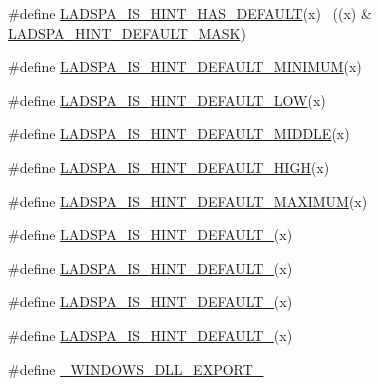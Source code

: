 \begin{DoxyCompactItemize}
\item 
\#define \hyperlink{win_2_l_a_d_s_p_a__plugins-win_2ladspa_8h_ad102c496a31aa9cff9213d9f26b820db}{L\+A\+D\+S\+P\+A\+\_\+\+I\+S\+\_\+\+H\+I\+N\+T\+\_\+\+H\+A\+S\+\_\+\+D\+E\+F\+A\+U\+LT}(x)  ~((x) \& \hyperlink{win_2_l_a_d_s_p_a__plugins-win_2ladspa_8h_a713062e0f0ae5956e12a217323c2a100}{L\+A\+D\+S\+P\+A\+\_\+\+H\+I\+N\+T\+\_\+\+D\+E\+F\+A\+U\+L\+T\+\_\+\+M\+A\+SK})
\item 
\#define \hyperlink{win_2_l_a_d_s_p_a__plugins-win_2ladspa_8h_ae7bd51b583e97ca49c27b4ea969d2c17}{L\+A\+D\+S\+P\+A\+\_\+\+I\+S\+\_\+\+H\+I\+N\+T\+\_\+\+D\+E\+F\+A\+U\+L\+T\+\_\+\+M\+I\+N\+I\+M\+UM}(x)
\item 
\#define \hyperlink{win_2_l_a_d_s_p_a__plugins-win_2ladspa_8h_a56c52818cfb9b1637e2fc7b95c239d33}{L\+A\+D\+S\+P\+A\+\_\+\+I\+S\+\_\+\+H\+I\+N\+T\+\_\+\+D\+E\+F\+A\+U\+L\+T\+\_\+\+L\+OW}(x)        
\item 
\#define \hyperlink{win_2_l_a_d_s_p_a__plugins-win_2ladspa_8h_a32aba3a3ba980295e45cd27f68b9be78}{L\+A\+D\+S\+P\+A\+\_\+\+I\+S\+\_\+\+H\+I\+N\+T\+\_\+\+D\+E\+F\+A\+U\+L\+T\+\_\+\+M\+I\+D\+D\+LE}(x)  
\item 
\#define \hyperlink{win_2_l_a_d_s_p_a__plugins-win_2ladspa_8h_a8360d24dea0ecb7f3a6f9073bdcac022}{L\+A\+D\+S\+P\+A\+\_\+\+I\+S\+\_\+\+H\+I\+N\+T\+\_\+\+D\+E\+F\+A\+U\+L\+T\+\_\+\+H\+I\+GH}(x)      
\item 
\#define \hyperlink{win_2_l_a_d_s_p_a__plugins-win_2ladspa_8h_ace35625c957e0a27e3db683b33fb1e9f}{L\+A\+D\+S\+P\+A\+\_\+\+I\+S\+\_\+\+H\+I\+N\+T\+\_\+\+D\+E\+F\+A\+U\+L\+T\+\_\+\+M\+A\+X\+I\+M\+UM}(x)
\item 
\#define \hyperlink{win_2_l_a_d_s_p_a__plugins-win_2ladspa_8h_a616386756160157df8c950470e87dcf4}{L\+A\+D\+S\+P\+A\+\_\+\+I\+S\+\_\+\+H\+I\+N\+T\+\_\+\+D\+E\+F\+A\+U\+L\+T\+\_}(x)            
\item 
\#define \hyperlink{win_2_l_a_d_s_p_a__plugins-win_2ladspa_8h_ae8dd6d1a1b9f0f7047922d492add8be2}{L\+A\+D\+S\+P\+A\+\_\+\+I\+S\+\_\+\+H\+I\+N\+T\+\_\+\+D\+E\+F\+A\+U\+L\+T\+\_}(x)            
\item 
\#define \hyperlink{win_2_l_a_d_s_p_a__plugins-win_2ladspa_8h_a8c0e71bc5647b77d7c5ceb1cfa527d37}{L\+A\+D\+S\+P\+A\+\_\+\+I\+S\+\_\+\+H\+I\+N\+T\+\_\+\+D\+E\+F\+A\+U\+L\+T\+\_}(x)        
\item 
\#define \hyperlink{win_2_l_a_d_s_p_a__plugins-win_2ladspa_8h_a3a732b9562b9f51091e38049b1f813f2}{L\+A\+D\+S\+P\+A\+\_\+\+I\+S\+\_\+\+H\+I\+N\+T\+\_\+\+D\+E\+F\+A\+U\+L\+T\+\_}(x)        
\item 
\#define \hyperlink{win_2_l_a_d_s_p_a__plugins-win_2ladspa_8h_aa2a8bb4f4c66533d57d205f4d3583f4f}{\+\_\+\+W\+I\+N\+D\+O\+W\+S\+\_\+\+D\+L\+L\+\_\+\+E\+X\+P\+O\+R\+T\+\_\+}
\end{DoxyCompactItemize}
